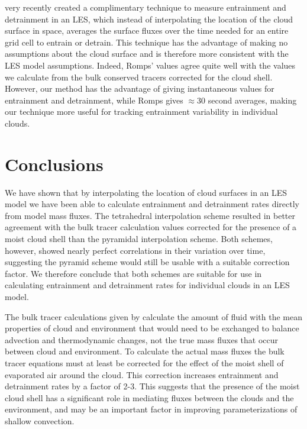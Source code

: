 \documentclass[12pt]{article}
\begin{document}
\cite{Romps2010} very recently created a complimentary technique to measure 
entrainment and detrainment in an LES, which instead of interpolating the 
location of the cloud surface in space, averages the surface fluxes over the 
time needed for an entire grid cell to entrain or detrain.  This technique has 
the advantage of making no assumptions about the cloud surface and is therefore 
more consistent with the LES model assumptions.  Indeed, Romps' values agree 
quite well with the values we calculate from the bulk conserved tracers 
corrected for the cloud shell.  However, our method has the advantage of giving 
instantaneous values for entrainment and detrainment, while Romps gives 
$\approx$30 second averages, making our technique more useful for tracking 
entrainment variability in individual clouds.


\section{Conclusions}

We have shown that by interpolating the location of cloud surfaces in an LES
model we have been able to calculate entrainment and detrainment rates directly 
from model mass fluxes.  The tetrahedral interpolation scheme resulted in
better agreement with the bulk tracer calculation values corrected for the 
presence of a moist cloud shell than the pyramidal interpolation scheme.  Both 
schemes, however, showed nearly perfect correlations in their variation over 
time, suggesting the pyramid scheme would still be usable with a suitable 
correction factor.  We therefore conclude that both schemes are suitable for 
use in calculating entrainment and detrainment rates for individual clouds in 
an LES model.

The bulk tracer calculations given by \cite{Siebesma1995} calculate the amount
of fluid with the mean properties of cloud and environment that would need to
be exchanged to balance advection and thermodynamic changes, not the true mass
fluxes that occur between cloud and environment.  To calculate the actual mass
fluxes the bulk tracer equations must at least be corrected for the effect of
the moist shell of evaporated air around the cloud.  This correction increases
entrainment and detrainment rates by a factor of 2-3.  This suggests that the
presence of the moist cloud shell has a significant role in mediating fluxes
between the clouds and the environment, and may be an important factor in 
improving parameterizations of shallow convection.
\end{document}
